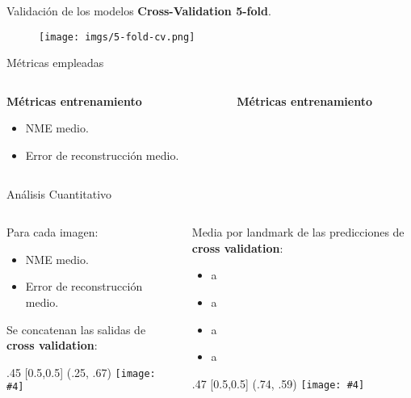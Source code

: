 \documentclass[aspectratio=43]{beamer}
\newcommand{\absimage}[4][0.5,0.5]{%
	\begin{textblock}{#3}%
		[#1]%
		(#2)%
		\texttt{[image: \#4]}%
\end{textblock}}
\begin{document}
\begin{frame}[t]{Validación de los modelos}
  \textbf{Cross-Validation 5-fold}.
  \begin{figure}
    \centering
    \texttt{[image: imgs/5-fold-cv.png]}
  \end{figure}
\end{frame}

\begin{frame}[t]{Métricas empleadas}
\begin{columns}[onlytextwidth]
  \begin{column}{.5\textwidth}
    \textbf{Métricas entrenamiento}
    \begin{itemize}
      \item NME medio.
      \item Error de reconstrucción medio.
    \end{itemize}
  \end{column}
  \begin{column}{.5\textwidth}
    \textbf{Métricas entrenamiento}
  \end{column}
\end{columns}

\end{frame}

\begin{frame}[t]{Análisis Cuantitativo}
  \begin{columns}[onlytextwidth]
    \begin{column}{.5\textwidth}
      Para cada imagen: 
      \begin{itemize}
        \item NME medio.
        \item Error de reconstrucción medio.
      \end{itemize}

      Se concatenan las salidas de \textbf{cross validation}:
      \absimage{.25, .67}{.45}{imgs/boxplot_sumarize.png}
    \end{column}
    \begin{column}{.5\textwidth}
      Media por landmark de las predicciones de \textbf{cross validation}:
      \begin{itemize}
        \item a
        \item a
        \item a
        \item a
      \end{itemize}
      \absimage{.74, .59}{.47}{imgs/tabla_landmarks.png}
    \end{column}
  \end{columns}
\end{frame}
\end{document}
